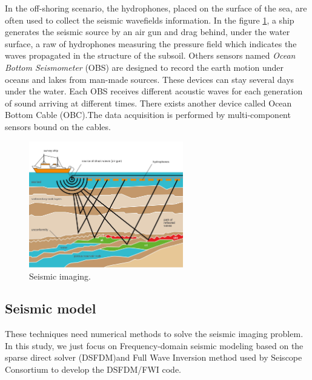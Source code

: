 \begin{itemize}
In the off-shoring scenario, the hydrophones, placed on the surface of the sea, are often used to collect the seismic wavefields information. In the figure \ref{hydrophones}, a ship generates the seismic source by an air gun and drag behind, under the water surface, a raw of hydrophones measuring the pressure field which indicates the waves propagated in the structure of the subsoil. Others sensors named \textit{Ocean Bottom Seismometer} (OBS) are designed to record the earth motion under oceans and lakes from man-made sources. These devices can stay several days under the water. Each OBS receives different acoustic waves for each generation of sound arriving at different times. There exists another device called Ocean Bottom Cable (OBC).The data acquisition is performed by multi-component sensors bound on the cables. 
\begin{figure}[!h]
\centering 
\includegraphics[width=0.6\textwidth]{images/hydrophones.jpg}
\caption{Seismic imaging.}
\label{hydrophones} 
\end{figure}
\end{itemize}

\subsection{Seismic model}
These techniques need numerical methods to solve the seismic imaging problem. In this study, we just focus on Frequency-domain seismic modeling based on the sparse direct solver (DSFDM)and Full Wave Inversion method used by Seiscope Consortium to develop the DSFDM/FWI code.

